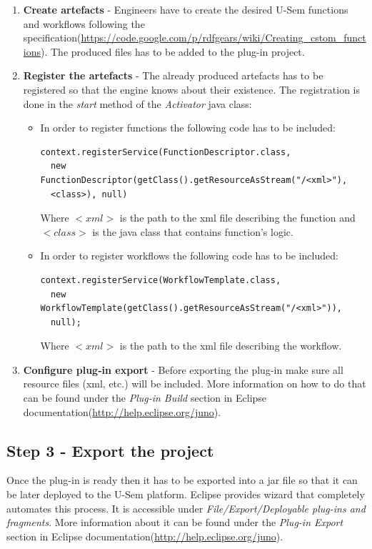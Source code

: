 \begin{enumerate}
	\item \textbf{Create artefacts} - Engineers have to create the desired U-Sem functions and workflows following the specification(\url{https://code.google.com/p/rdfgears/wiki/Creating_cstom_functions}). The produced files has to be added to the plug-in project.
	\item \textbf{Register the artefacts} - The already produced artefacts has to be registered so that the engine knows about their existence. The registration is done in the \textit{start} method of the \textit{Activator} java class:
	\begin{itemize}
	
		\item In order to register functions the following code has to be included:
		
\begin{lstlisting}
context.registerService(FunctionDescriptor.class, 
  new FunctionDescriptor(getClass().getResourceAsStream("/<xml>"), 
  <class>), null)
\end{lstlisting}

		Where \textit{$<xml>$} is the path to the xml file describing the function and \textit{$<class>$} is the java class that contains function's logic.
		
		\item In order to register workflows the following code has to be included: 
\begin{lstlisting}
context.registerService(WorkflowTemplate.class,
  new WorkflowTemplate(getClass().getResourceAsStream("/<xml>")),
  null);
\end{lstlisting}

		Where \textit{$<xml>$} is the path to the xml file describing the workflow.
		
	\end{itemize}
	\item \textbf{Configure plug-in export} -  Before exporting the plug-in make sure all resource files (xml, etc.) will be included. More information on how to do that can be found under the \textit{Plug-in Build} section in Eclipse documentation(\url{http://help.eclipse.org/juno}).
	
	
\end{enumerate}

\subsection{Step 3 - Export the project}
Once the plug-in is ready then it has to be exported into a jar file so that it can be later deployed to the U-Sem platform. Eclipse provides wizard that completely automates this process. It is accessible under \textit{File/Export/Deployable plug-ins and fragments}. More information about it can be found under the \textit{Plug-in Export} section in Eclipse documentation(\url{http://help.eclipse.org/juno}).

